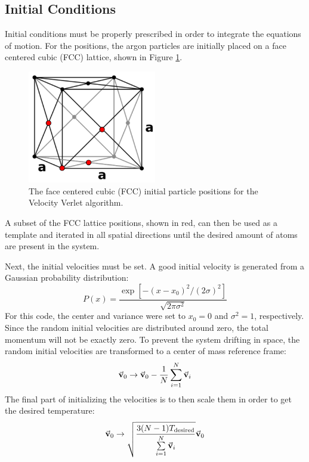 \documentclass[12pt,oneside,a4paper]{article}
\newcommand{\bv}{\vec {\bf v}}
\begin{document}
\subsection{Initial Conditions}

Initial conditions must be properly prescribed in order to integrate the equations of motion.  For the positions,  the argon particles are initially placed on a face centered cubic (FCC) lattice, shown in Figure \ref{fig:fcc}.
\begin{figure}[!h]
	\centering
	\includegraphics[width=0.5\textwidth]{./fcc.pdf}
	\caption{The face centered cubic (FCC) initial particle positions for the Velocity Verlet algorithm.}
	\label{fig:fcc}
\end{figure} 
A subset of the FCC lattice positions, shown in red, can then be used as a template and iterated in all spatial directions until the desired amount of atoms are present in the system.

Next, the initial velocities must be set.  A good initial velocity is generated from a Gaussian probability distribution:
\begin{equation}
P(x) = \frac{\exp\left[-\left(x-x_0\right)^2/\left(2\sigma\right)^2\right]}{\sqrt{2\pi \sigma^2}}
\end{equation}
For this code, the center and variance were set to $x_0=0$ and $\sigma^2=1$, respectively.  Since the random initial velocities are distributed around zero, the total momentum will not be exactly zero.  To prevent the system drifting in space, the random initial velocities are transformed to a center of mass reference frame:
\begin{equation}
\bv_0 \rightarrow \bv_0 - \frac{1}{N}\sum\limits_{i=1}^N \bv_i
\end{equation}
The final part of initializing the velocities is to then scale them in order to get the desired temperature:
\begin{equation}
\bv_0 \rightarrow \sqrt{\frac{3(N-1)T_\text{desired}}{\sum\limits_{i=1}^N \bv_i}}\bv_0 
\end{equation}
\end{document}
